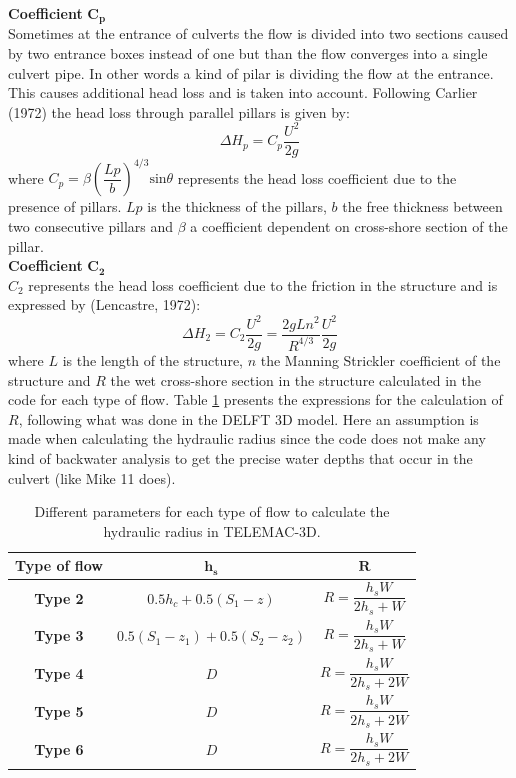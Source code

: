 \textbf{Coefficient} $\mathbf{C_p}$\\
Sometimes at the entrance of culverts the flow is divided into two sections
caused by two entrance boxes instead of one but than the flow converges into
a single culvert pipe. In other words a kind of pilar is dividing the flow at the entrance.
This causes additional head loss and is taken into account.
Following Carlier (1972) the head loss through parallel pillars is given by:
\begin{equation}
\Delta H_p = C_p \dfrac{U^2}{2g}
\end{equation}
where $C_p=\beta \left(\dfrac{Lp}{b}\right)^{4/3} \text{sin} \theta$  represents the head
loss coefficient due to the presence of pillars. $Lp$ is the thickness of the pillars, $b$
the free thickness between two consecutive pillars and $\beta$
a coefficient dependent on cross-shore section of the pillar.\\

\textbf{Coefficient} $\mathbf{C_2}$\\
$C_2$ represents the head loss coefficient due to the friction in the structure
and is expressed by (Lencastre, 1972):
\begin{equation}
\Delta H_2 = C_2  \dfrac{U^2}{2g} = \dfrac{2gLn^2}{R^{4/3}}\dfrac{U^2}{2g}
\end{equation}
where $L$ is the length of the structure, $n$ the Manning Strickler coefficient
of the structure and $R$ the wet cross-shore section in the structure calculated
in the code for each type of flow.
Table \ref{tab:culvert_tab3} presents the expressions for the calculation of $R$,
following what was done in the DELFT 3D model.
Here an assumption is made when calculating the hydraulic radius since the
code does not make any kind of backwater analysis to get the
precise water depths that occur in the culvert (like Mike 11 does).
\begin{table}[H]
\caption{Different parameters for each type of flow to calculate the hydraulic radius in TELEMAC-3D.}
\label{tab:culvert_tab3}
\begin{center}\begin{tabular}{|c|c|c|}
\hline
\textbf{Type of flow} & $\mathbf{h_s}$ & $\mathbf{R}$ \\
\hline
\textbf{Type 2} & $0.5 h_c + 0.5(S_1-z)$    & $R = \dfrac{h_s W}{2 h_s+W}$ \\
\hline
\textbf{Type 3} & $0.5 (S_1 - z_1) + 0.5(S_2-z_2)$    & $R = \dfrac{h_s W}{2 h_s+W}$ \\
\hline
\textbf{Type 4} & $D$    & $R = \dfrac{h_s W}{2 h_s+2W}$ \\
\hline
\textbf{Type 5} & $D$    & $R = \dfrac{h_s W}{2 h_s+2W}$ \\
\hline
\textbf{Type 6} & $D$    & $R = \dfrac{h_s W}{2 h_s+2W}$ \\
\hline
\end{tabular}\end{center}
\end{table}

